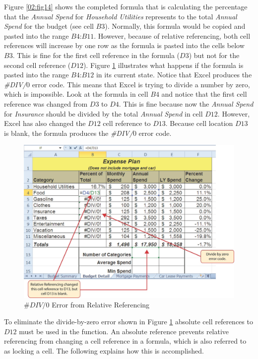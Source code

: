 Figure \ref{02:fig14} shows the completed formula that is calculating the percentage that the \textit{Annual Spend} for \textit{Household Utilities}  represents to the total \textit{Annual Spend} for the budget (see cell \textit{$ B3 $}). Normally, this formula would be copied and pasted into the range $ B4 $:$ B11 $. However, because of relative referencing, both cell references will increase by one row as the formula is pasted into the cells below $ B3 $. This is fine for the first cell reference in the formula ($ D3 $) but not for the second cell reference ($ D12 $). Figure \ref{02:fig15} illustrates what happens if the formula is pasted into the range $ B4 $:$ B12 $ in its current state. Notice that Excel produces the \textit{\#DIV/$ 0 $} error code. This means that Excel is trying to divide a number by zero, which is impossible. Look at the formula in cell $ B4 $ and notice that the first cell reference was changed from $ D3 $ to $ D4 $. This is fine because now the \textit{Annual Spend} for \textit{Insurance} should be divided by the total \textit{Annual Spend} in cell $ D12 $. However, Excel has also changed the $ D12 $ cell reference to $ D13 $. Because cell location $ D13 $ is blank, the formula produces the \textit{\#DIV/$ 0 $} error code.

\begin{figure}[H]
	\centering
	\includegraphics[width=\maxwidth{.95\linewidth}]{gfx/ch02_fig15}
	\caption{$ \#DIV/0 $ Error from Relative Referencing}
	\label{02:fig15}
\end{figure}

To eliminate the divide-by-zero error shown in Figure \ref{02:fig15} absolute cell references to $ D12 $ must be used in the function. An absolute reference prevents relative referencing from changing a cell reference in a formula, which is also referred to as locking a cell. The following explains how this is accomplished.

